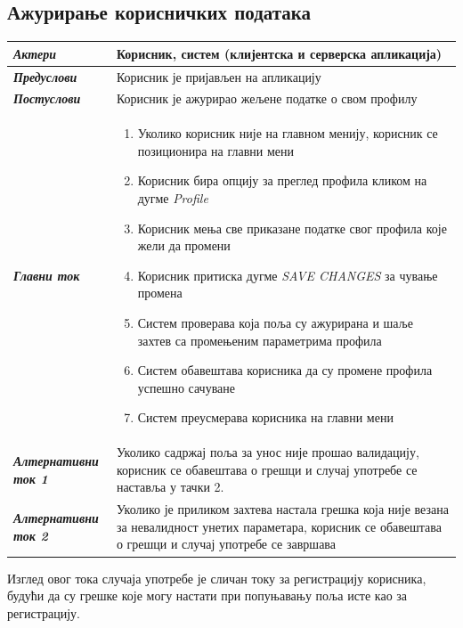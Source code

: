 \documentclass[12pt,oneside]{memoir}
\begin{document}
\subsection*{Ажурирање корисничких података}
\begin{longtable}{p{0.23\linewidth} p{0.77\linewidth}}

 \hline
 \textit{\textbf{Актери}} & Корисник, систем (клијентска и серверска апликација) \\
\hline

\textit{\textbf{Предуслови}} & Корисник је пријављен на апликацију \\
 \hline
\textit{\textbf{Постуслови}} & Корисник је ажурирао жељене податке о свом профилу \\
 \hline
 \textit{\textbf{Главни ток}} & 
    \begin{enumerate}
        \item Уколико корисник није на главном менију, корисник се позиционира на главни мени
        \item Корисник бира опцију за преглед профила кликом на дугме \textit{Profile}
        \item Корисник мења све приказане податке свог профила које жели да промени
        \item Корисник притиска дугме \textit{SAVE CHANGES} за чување промена
        \item Систем проверава која поља су ажурирана и шаље захтев са промењеним параметрима профила
        \item Систем обавештава корисника да су промене профила успешно сачуване
        \item Систем преусмерава корисника на главни мени
    \end{enumerate}\\
 \hline
\textit{\textbf{Алтернативни ток 1}} & Уколико садржај поља за унос није прошао валидацију, корисник се обавештава о грешци и случај употребе се наставља у тачки 2.\\
 \hline
\textit{\textbf{Алтернативни ток 2}} & Уколико је приликом захтева настала грешка која није везана за невалидност унетих параметара, корисник се обавештава о грешци и случај употребе се завршава \\
 \hline 
\end{longtable}

Изглед овог тока случаја употребе је сличан току за регистрацију корисника, будући да су грешке које могу настати при попуњавању поља исте као за регистрацију.
\end{document}
